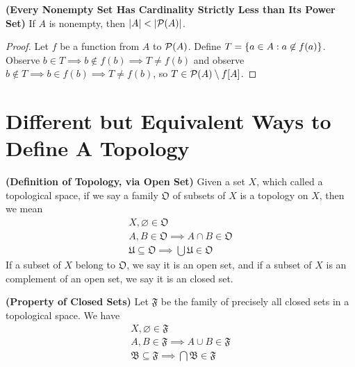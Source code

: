 \documentclass{report}
\begin{document}
\begin{theorem}
\label{2.4.19}
\textbf{(Every Nonempty Set Has Cardinality Strictly Less than Its Power Set)} If $A$ is nonempty, then  $\abso{A}<\abso{\power{A}}$.
\end{theorem}
\begin{proof}
Let $f$ be a function from $A$ to  $\mathcal{P}(A)$. Define $T=\{ a\in A:a\not\in f(a) \}$. Observe $b \in T\implies b\not\in f(b)\implies T\neq f(b)$ and observe $b\not\in T\implies b\in f(b)\implies T\neq f(b)$, so $T\in \mathcal{P}(A)\setminus f[A]$.  
\end{proof}
\section{Different but Equivalent Ways to Define A Topology}
\begin{definition}
\label{2.5.1}
\textbf{(Definition of Topology, via Open Set)} Given a set $X$, which called a topological space, if we say a family $\mathfrak{O}$  of subsets of $X$ is a topology on $X$, then we mean
\begin{gather}
X, \varnothing \in \mathfrak{O}\\
A,B\in\mathfrak{O}\implies A\cap B\in\mathfrak{O}\\
\mathfrak{U}\subseteq \mathfrak{O}\implies \bigcup \mathfrak{U}\in \mathfrak{O}
\end{gather}
If a subset of $X$ belong to  $\mathfrak{O}$, we say it is an open set, and if a subset of $X$ is an complement of an open set, we say it is an closed set.
\end{definition}
\begin{theorem}
\label{2.5.2}
\textbf{(Property of Closed Sets)} Let $\mathfrak{F}$ be the family of precisely all closed sets in a topological space. We have
\begin{gather}
X,\varnothing \in \mathfrak{F}\\
A,B\in\mathfrak{F}\implies A\cup  B\in\mathfrak{F}\\
\mathfrak{B}\subseteq \mathfrak{F}\implies \bigcap \mathfrak{B}\in \mathfrak{F}
\end{gather}
\end{theorem}
\end{document}
